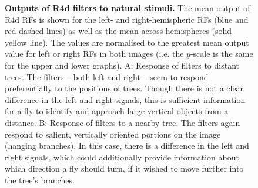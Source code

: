 \begin{figure}[htp]
	\caption{
		{\bf Outputs of R4d filters to natural stimuli.}
		The mean output of R4d RFs is shown for the left- and right-hemispheric RFs (blue and red dashed lines) as well as the mean across hemispheres (solid yellow line).
		The values are normalised to the greatest mean output value for left or right RFs in both images (i.e. the $y$-scale is the same for the upper and lower graphs).
		A: Response of filters to distant trees.
		The filters -- both left and right -- seem to respond preferentially to the positions of trees.
		Though there is not a clear difference in the left and right signals, this is sufficient information for a fly to identify and approach large vertical objects from a distance.
		B: Response of filters to a nearby tree.
		The filters again respond to salient, vertically oriented portions on the image (hanging branches).
		In this case, there is a difference in the left and right signals, which could additionally provide information about which direction a fly should turn, if it wished to move further into the tree's branches.
	}
	\label{fig:naturalstim}
\end{figure}


